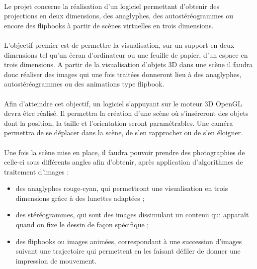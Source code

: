 	\paragraph{}
	Le projet concerne la réalisation d’un logiciel permettant d’obtenir des projections en deux dimensions, des anaglyphes, des autostéréogrammes ou encore des flipbooks à partir de scènes virtuelles en trois dimensions. 

\paragraph{}

	L’objectif premier est de permettre la visualisation, sur un support en deux dimensions tel qu’un écran d’ordinateur ou une feuille de papier, d’un espace en trois dimensions. A partir de la visualisation d’objets 3D dans une scène il faudra donc réaliser des images qui une fois traitées donneront lieu à des anaglyphes, autostéréogrammes ou des animations type flipbook.
	
\paragraph{}
	Afin d’atteindre cet objectif, un logiciel s’appuyant sur le moteur 3D OpenGL devra être réalisé. Il permettra la création d’une scène où s’inséreront des objets dont la position, la taille et l’orientation seront paramétrables. Une caméra permettra de se déplacer dans la scène, de s’en rapprocher ou de s’en éloigner.

\paragraph{}
	Une fois la scène mise en place, il faudra pouvoir prendre des photographies de celle-ci sous différents angles afin d’obtenir, après application d’algorithmes de traitement d’images :

\begin{itemize}
	\item
		des anaglyphes rouge-cyan, qui permettront une visualisation en trois dimensions grâce à des lunettes adaptées ;
	\item
		des stéréogrammes, qui sont des images dissimulant un contenu qui apparaît quand on fixe le dessin de façon spécifique ;
	\item
		des flipbooks ou images animées, correspondant à une succession d’images suivant une trajectoire qui permettent en les faisant défiler de donner une impression de mouvement.
\end{itemize}
